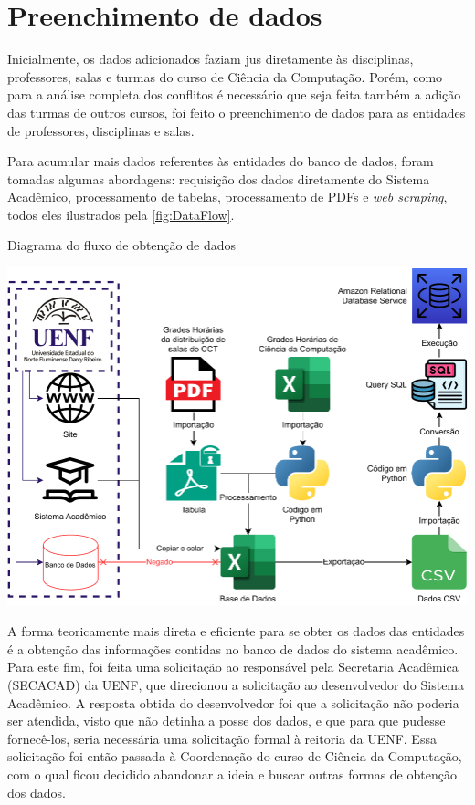 \section{Preenchimento de dados} \label{sec:preenchimento}

Inicialmente, os dados adicionados faziam jus diretamente às disciplinas, professores, salas e turmas do curso de Ciência da Computação. Porém, como para a análise completa dos conflitos é necessário que seja feita também a adição das turmas de outros cursos, foi feito o preenchimento de dados para as entidades de professores, disciplinas e salas.

Para acumular mais dados referentes às entidades do banco de dados, foram tomadas algumas abordagens: requisição dos dados diretamente do Sistema Acadêmico, processamento de tabelas, processamento de PDFs e \textit{web scraping}, todos eles ilustrados pela \autoref{fig:DataFlow}.

\begin{MyCenteredFigure} \caption{Diagrama do fluxo de obtenção de dados} \label{fig:DataFlow}
  \includegraphics[width=\textwidth]{files/img/2.02!5-desenvolvimento/2.02!5.1.4-sistema/diagramas/Processamento de dados}
\end{MyCenteredFigure}

A forma teoricamente mais direta e eficiente para se obter os dados das entidades é a obtenção das informações contidas no banco de dados do sistema acadêmico. Para este fim, foi feita uma solicitação ao responsável pela Secretaria Acadêmica (SECACAD) da UENF, que direcionou a solicitação ao desenvolvedor do Sistema Acadêmico. A resposta obtida do desenvolvedor foi que a solicitação não poderia ser atendida, visto que não detinha a posse dos dados, e que para que pudesse fornecê-los, seria necessária uma solicitação formal à reitoria da UENF. Essa solicitação foi então passada à Coordenação do curso de Ciência da Computação, com o qual ficou decidido abandonar a ideia e buscar outras formas de obtenção dos dados.

